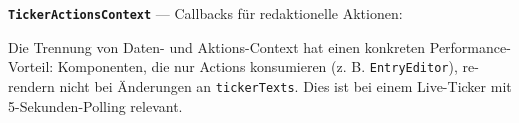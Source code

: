 \textbf{\texttt{TickerActionsContext}} --- Callbacks für redaktionelle
Aktionen:

\begin{Shaded}
\begin{Highlighting}[]
\OperatorTok{:}\OperatorTok{:} \OperatorTok{,}\OperatorTok{:}\KeywordTok{=\textgreater{}} \OperatorTok{\textless{}}\OperatorTok{\textgreater{};}
\OperatorTok{:}\OperatorTok{,}\NormalTok{) }\KeywordTok{=\textgreater{}} \OperatorTok{\textless{}}\OperatorTok{\textgreater{};}
\OperatorTok{:}\OperatorTok{:} \OperatorTok{,}\OperatorTok{:} \NormalTok{) }\KeywordTok{=\textgreater{}} \OperatorTok{;}
\OperatorTok{:}\OperatorTok{:} \OperatorTok{,}\OperatorTok{:} \OperatorTok{,} \NormalTok{) }\KeywordTok{=\textgreater{}} \OperatorTok{;}
\OperatorTok{:}\OperatorTok{:} \OperatorTok{,}\OperatorTok{:} \NormalTok{) }\KeywordTok{=\textgreater{}} \OperatorTok{\textless{}}\OperatorTok{\textgreater{};}
\OperatorTok{:}\OperatorTok{:} \NormalTok{) }\KeywordTok{=\textgreater{}} \OperatorTok{\textless{}}\OperatorTok{\textgreater{};}
\OperatorTok{:}  \OperatorTok{|} \OperatorTok{;}
\OperatorTok{:}\NormalTok{ () }\KeywordTok{=\textgreater{}} \OperatorTok{;}
\NormalTok{\}}
\end{Highlighting}
\end{Shaded}

Die Trennung von Daten- und Aktions-Context hat einen konkreten
Performance-Vorteil: Komponenten, die nur Actions konsumieren (z. B.
\texttt{EntryEditor}), re-rendern nicht bei Änderungen an
\texttt{tickerTexts}. Dies ist bei einem Live-Ticker mit
5-Sekunden-Polling relevant.

